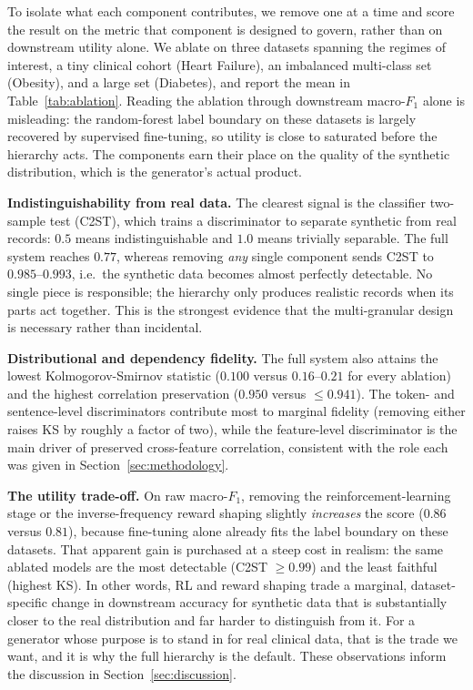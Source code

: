 To isolate what each component contributes, we remove one at a time and score the result on the metric that component is designed to govern, rather than on downstream utility alone. We ablate on three datasets spanning the regimes of interest, a tiny clinical cohort (Heart Failure), an imbalanced multi-class set (Obesity), and a large set (Diabetes), and report the mean in Table~\ref{tab:ablation}. Reading the ablation through downstream macro-$F_1$ alone is misleading: the random-forest label boundary on these datasets is largely recovered by supervised fine-tuning, so utility is close to saturated before the hierarchy acts. The components earn their place on the quality of the synthetic distribution, which is the generator's actual product.



\noindent\textbf{Indistinguishability from real data.}
The clearest signal is the classifier two-sample test (C2ST), which trains a discriminator to separate synthetic from real records: $0.5$ means indistinguishable and $1.0$ means trivially separable. The full system reaches $0.77$, whereas removing \emph{any} single component sends C2ST to $0.985$--$0.993$, i.e.\ the synthetic data becomes almost perfectly detectable. No single piece is responsible; the hierarchy only produces realistic records when its parts act together. This is the strongest evidence that the multi-granular design is necessary rather than incidental.

\noindent\textbf{Distributional and dependency fidelity.}
The full system also attains the lowest Kolmogorov-Smirnov statistic ($0.100$ versus $0.16$--$0.21$ for every ablation) and the highest correlation preservation ($0.950$ versus $\leq 0.941$). The token- and sentence-level discriminators contribute most to marginal fidelity (removing either raises KS by roughly a factor of two), while the feature-level discriminator is the main driver of preserved cross-feature correlation, consistent with the role each was given in Section~\ref{sec:methodology}.

\noindent\textbf{The utility trade-off.}
On raw macro-$F_1$, removing the reinforcement-learning stage or the inverse-frequency reward shaping slightly \emph{increases} the score ($0.86$ versus $0.81$), because fine-tuning alone already fits the label boundary on these datasets. That apparent gain is purchased at a steep cost in realism: the same ablated models are the most detectable (C2ST $\geq 0.99$) and the least faithful (highest KS). In other words, RL and reward shaping trade a marginal, dataset-specific change in downstream accuracy for synthetic data that is substantially closer to the real distribution and far harder to distinguish from it. For a generator whose purpose is to stand in for real clinical data, that is the trade we want, and it is why the full hierarchy is the default. These observations inform the discussion in Section~\ref{sec:discussion}.

